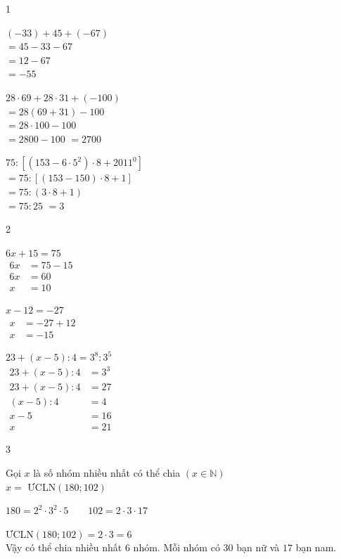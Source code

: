 \begin{Solbook}{1}
 \par \noindent  \begin {listEX}[3] \item $(-33) + 45 + (-67)$\\ $= 45 - 33 - 67$\\ $= 12 - 67$\\ $= -55$ \item $28\cdot 69 + 28\cdot 31 + (-100)$\\ $= 28(69 + 31) - 100$\\ $= 28\cdot 100 - 100$\\ $= 2800 - 100$ $= 2700$ \item $75:\left [ (153 - 6\cdot 5^2)\cdot 8 + 2011^0\right ]$\\ $= 75:\left [(153 - 150)\cdot 8 + 1\right ]$\\ $= 75:(3\cdot 8 + 1)$\\ $= 75:25$ $= 3$ \end {listEX}  \hfill \qedEX 
\end{Solbook}
\begin{Solbook}{2}
 \par \noindent  \begin {listEX}[3] \item $6x + 15 = 75$\\ \hspace {2 cm}$\begin {aligned} 6x &= 75 - 15\\ 6x &= 60\\ x &= 10 \end {aligned}$ \item $x - 12 = -27$\\ \hspace {2 cm}$\begin {aligned} x &= -27 + 12\\ x &= -15 \end {aligned}$ \item $23 + (x - 5):4 = 3^8 : 3^5$\\ \hspace {1 cm}$\begin {aligned} 23 + (x - 5):4 &= 3^3\\ 23 + (x - 5):4 &= 27\\ (x - 5):4 &= 4\\ x - 5 &= 16\\ x &= 21 \end {aligned}$ \end {listEX} \par  \hfill \qedEX 
\end{Solbook}
\begin{Solbook}{3}
 \par \noindent  Gọi $x$ là số nhóm nhiều nhất có thể chia $(x\in \mathbb N)$\\ $x =$ ƯCLN$(180;102)$ \par $180=2^2\cdot 3^2\cdot 5\qquad 102=2\cdot 3\cdot 17$ \par ƯCLN$(180;102)=2\cdot 3=6$\\ Vậy có thể chia nhiều nhất 6 nhóm. Mỗi nhóm có $30$ bạn nữ và $17$ bạn nam.  \hfill \qedEX 
\end{Solbook}
